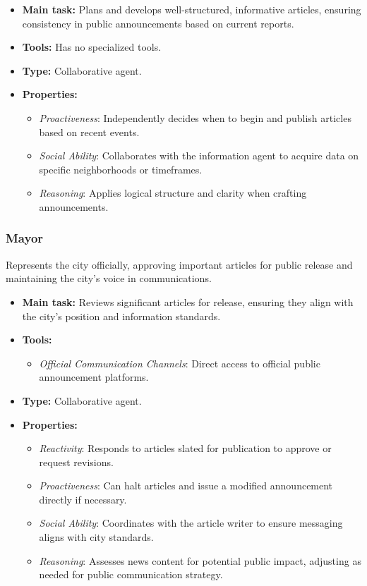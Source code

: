 \begin{itemize}
    \item \textbf{Main task:} Plans and develops well-structured, informative articles, ensuring consistency in public announcements based on current reports.
    \item \textbf{Tools:} Has no specialized tools.
    \item \textbf{Type:} Collaborative agent.
    \item \textbf{Properties:}
    \begin{itemize}
        \item \emph{Proactiveness}: Independently decides when to begin and publish articles based on recent events.
        \item \emph{Social Ability}: Collaborates with the information agent to acquire data on specific neighborhoods or timeframes.
        \item \emph{Reasoning}: Applies logical structure and clarity when crafting announcements.
    \end{itemize}
\end{itemize}

\subsubsection{Mayor}

Represents the city officially, approving important articles for public release and maintaining the city’s voice in communications.

\begin{itemize}
    \item \textbf{Main task:} Reviews significant articles for release, ensuring they align with the city’s position and information standards.
    \item \textbf{Tools:} 
    \begin{itemize}
        \item \emph{Official Communication Channels}: Direct access to official public announcement platforms.
    \end{itemize}
    \item \textbf{Type:} Collaborative agent.
    \item \textbf{Properties:}
    \begin{itemize}
        \item \emph{Reactivity}: Responds to articles slated for publication to approve or request revisions.
        \item \emph{Proactiveness}: Can halt articles and issue a modified announcement directly if necessary.
        \item \emph{Social Ability}: Coordinates with the article writer to ensure messaging aligns with city standards.
        \item \emph{Reasoning}: Assesses news content for potential public impact, adjusting as needed for public communication strategy.
    \end{itemize}
\end{itemize}

